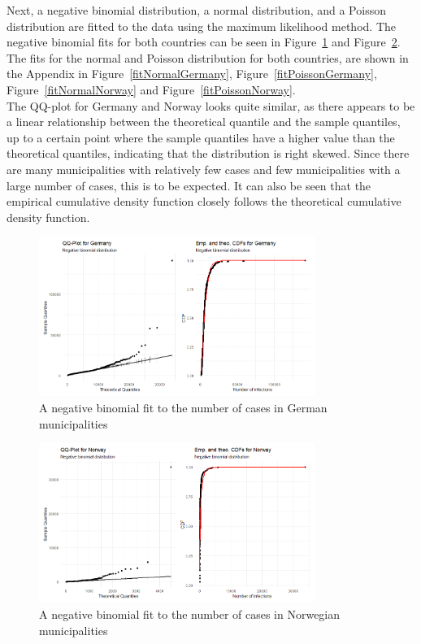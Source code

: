Next, a negative binomial distribution, a normal distribution, and a Poisson distribution are fitted to the data using the maximum likelihood method. The negative binomial fits for both countries can be seen in Figure~\ref{fitNegbinomGermany} and Figure~\ref{fitNegbinomNorway}. The fits for the normal and Poisson distribution for both countries, are shown in the Appendix in Figure~\ref{fitNormalGermany}, Figure~\ref{fitPoissonGermany}, Figure~\ref{fitNormalNorway} and Figure~\ref{fitPoissonNorway}. \\
The QQ-plot for Germany and Norway looks quite similar, as there appears to be a linear relationship between the theoretical quantile and the sample quantiles, up to a certain point where the sample quantiles have a higher value than the theoretical quantiles, indicating that the distribution is right skewed. Since there are many municipalities with relatively few cases and few municipalities with a large number of cases, this is to be expected. It can also be seen that the empirical cumulative density function closely follows the theoretical cumulative density function.
\begin{figure}[H]
  \centering
  \includegraphics[width = 0.8\textwidth]{fit_nbinom_germany.png}
  \caption{A negative binomial fit to the number of cases in German municipalities}
  \label{fitNegbinomGermany}
\end{figure}
\begin{figure}[H]
  \centering
  \includegraphics[width = 0.8\textwidth]{fit_nbinom_norway.png}
  \caption{A negative binomial fit to the number of cases in Norwegian municipalities}
  \label{fitNegbinomNorway}
\end{figure}

